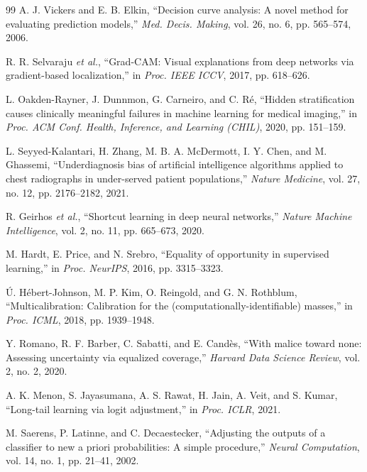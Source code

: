 \documentclass[journal]{IEEEtran}
\begin{document}
\begin{thebibliography}{99}
 A. J. Vickers and E. B. Elkin, ``Decision curve analysis: A novel
method for evaluating prediction models,'' \emph{Med. Decis. Making}, vol. 26, no. 6, pp.
565--574, 2006.

 R. R. Selvaraju \emph{et al.}, ``Grad-CAM: Visual explanations
from deep networks via gradient-based localization,'' in \emph{Proc. IEEE ICCV}, 2017, pp.
618--626.

 L. Oakden-Rayner, J. Dunnmon, G. Carneiro, and C. R\'{e},
``Hidden stratification causes clinically meaningful failures in machine learning for medical
imaging,'' in \emph{Proc. ACM Conf. Health, Inference, and Learning (CHIL)}, 2020, pp.
151--159.

 L. Seyyed-Kalantari, H. Zhang, M. B. A.
McDermott, I. Y. Chen, and M. Ghassemi, ``Underdiagnosis bias of artificial intelligence
algorithms applied to chest radiographs in under-served patient populations,'' \emph{Nature
Medicine}, vol. 27, no. 12, pp. 2176--2182, 2021.

 R. Geirhos \emph{et al.}, ``Shortcut learning in deep neural
networks,'' \emph{Nature Machine Intelligence}, vol. 2, no. 11, pp. 665--673, 2020.

 M. Hardt, E. Price, and N. Srebro, ``Equality of opportunity in
supervised learning,'' in \emph{Proc. NeurIPS}, 2016, pp. 3315--3323.

 \'{U}. H\'{e}bert-Johnson, M. P. Kim, O.
Reingold, and G. N. Rothblum, ``Multicalibration: Calibration for the
(computationally-identifiable) masses,'' in \emph{Proc. ICML}, 2018, pp. 1939--1948.

 Y. Romano, R. F. Barber, C. Sabatti, and E. Cand\`{e}s, ``With
malice toward none: Assessing uncertainty via equalized coverage,'' \emph{Harvard Data
Science Review}, vol. 2, no. 2, 2020.

 A. K. Menon, S. Jayasumana, A. S. Rawat, H. Jain, A. Veit, and
S. Kumar, ``Long-tail learning via logit adjustment,'' in \emph{Proc. ICLR}, 2021.

 M. Saerens, P. Latinne, and C. Decaestecker, ``Adjusting the
outputs of a classifier to new a priori probabilities: A simple procedure,'' \emph{Neural
Computation}, vol. 14, no. 1, pp. 21--41, 2002.


\end{thebibliography}
\end{document}
